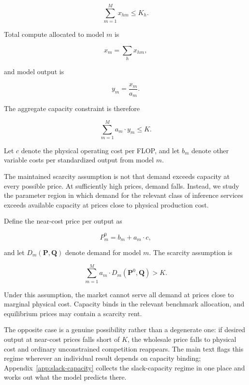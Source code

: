 \documentclass[11pt]{article}
\begin{document}
\begin{equation}\sum_{m=1}^{M}x_{hm}\leq K_h.\end{equation}

Total compute allocated to model $m$ is

\begin{equation}x_m=\sum_h x_{hm},\end{equation}

and model output is

\begin{equation}y_m=\frac{x_m}{a_m}.\end{equation}

The aggregate capacity constraint is therefore

\begin{equation}\sum_{m=1}^{M}a_m\cdot y_m\leq K.\end{equation}

Let $c$ denote the physical operating cost per FLOP, and let $b_m$ denote other variable costs per standardized output from model $m$.

The maintained scarcity assumption is not that demand exceeds capacity at every possible price. At sufficiently high prices, demand falls. Instead, we study the parameter region in which demand for the relevant class of inference services exceeds available capacity at prices close to physical production cost.

Define the near-cost price per output as

\begin{equation}P_m^0=b_m+a_m\cdot c,\end{equation}

and let $D_m(\mathbf P,\mathbf Q)$ denote demand for model $m$. The scarcity assumption is

\begin{equation}\sum_{m=1}^{M}a_m\cdot D_m(\mathbf P^0,\mathbf Q)>K.\end{equation}

Under this assumption, the market cannot serve all demand at prices close to marginal physical cost. Capacity binds in the relevant benchmark allocation, and equilibrium prices may contain a scarcity rent.

The opposite case is a genuine possibility rather than a degenerate one: if desired output at near-cost prices falls short of $K$, the wholesale price falls to physical cost and ordinary unconstrained competition reappears. The main text flags this regime wherever an individual result depends on capacity binding; Appendix~\ref{app:slack-capacity} collects the slack-capacity regime in one place and works out what the model predicts there.
\end{document}
